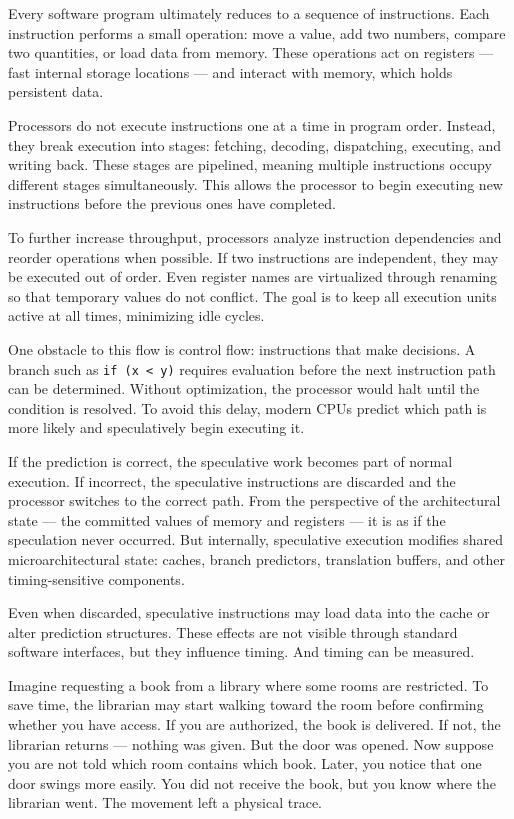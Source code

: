 Every software program ultimately reduces to a sequence of instructions. Each instruction performs a small operation: move a value, add two numbers, compare two quantities, or load data from memory. These operations act on registers — fast internal storage locations — and interact with memory, which holds persistent data.

Processors do not execute instructions one at a time in program order. Instead, they break execution into stages: fetching, decoding, dispatching, executing, and writing back. These stages are pipelined, meaning multiple instructions occupy different stages simultaneously. This allows the processor to begin executing new instructions before the previous ones have completed.

To further increase throughput, processors analyze instruction dependencies and reorder operations when possible. If two instructions are independent, they may be executed out of order. Even register names are virtualized through renaming so that temporary values do not conflict. The goal is to keep all execution units active at all times, minimizing idle cycles.

One obstacle to this flow is control flow: instructions that make decisions. A branch such as \texttt{if (x < y)} requires evaluation before the next instruction path can be determined. Without optimization, the processor would halt until the condition is resolved. To avoid this delay, modern CPUs predict which path is more likely and speculatively begin executing it.

If the prediction is correct, the speculative work becomes part of normal execution. If incorrect, the speculative instructions are discarded and the processor switches to the correct path. From the perspective of the architectural state — the committed values of memory and registers — it is as if the speculation never occurred. But internally, speculative execution modifies shared microarchitectural state: caches, branch predictors, translation buffers, and other timing-sensitive components.

Even when discarded, speculative instructions may load data into the cache or alter prediction structures. These effects are not visible through standard software interfaces, but they influence timing. And timing can be measured.

Imagine requesting a book from a library where some rooms are restricted. To save time, the librarian may start walking toward the room before confirming whether you have access. If you are authorized, the book is delivered. If not, the librarian returns — nothing was given. But the door was opened. Now suppose you are not told which room contains which book. Later, you notice that one door swings more easily. You did not receive the book, but you know where the librarian went. The movement left a physical trace.

